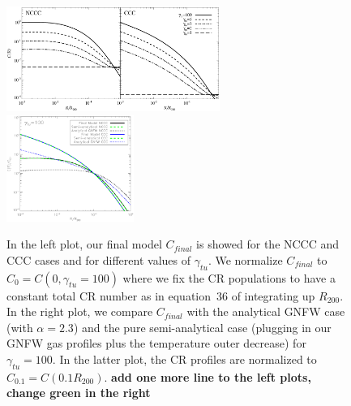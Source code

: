 \documentclass[traditabstract]{aa}
\begin{document}
\begin{figure}[hbt!]
\centering
\includegraphics[width=0.62\textwidth]{figures/CR_profiles_FinalModel.eps}
\includegraphics[width=0.37\textwidth]{figures/CR_profiles_FinalModelvsFakeREX_norm0.1.eps}
\caption{In the left plot, our final model $C_{final}$ is showed for the NCCC and CCC cases and for different values of $\gamma_{tu}$. We normalize $C_{final}$ to $C_{0}=C(0,\gamma_{tu}=100)$ where we fix the CR populations to have a constant total CR number as in equation~36 of \cite{2011A&A...527A..99E} integrating up $R_{200}$. In the right plot, we compare $C_{final}$ with the analytical GNFW case (with $\alpha=2.3$) and the pure semi-analytical case (plugging in our GNFW gas profiles plus the temperature outer decrease) for $\gamma_{tu}=100$. In the latter plot, the CR profiles are normalized to $C_{0.1}=C(0.1R_{200})$. {\bf add one more line to the left plots, change green in the right}}
\label{fig:CRFinalModel}
\end{figure}
\end{document}
